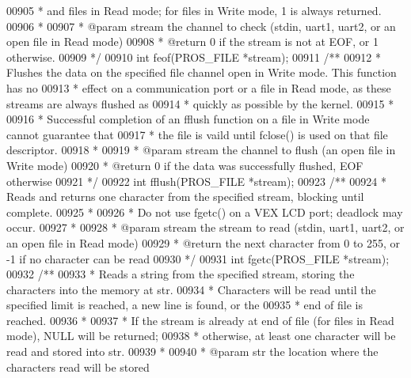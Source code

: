 \begin{DoxyCode}
00905 \textcolor{comment}{ * and files in Read mode; for files in Write mode, 1 is always returned.}
00906 \textcolor{comment}{ *}
00907 \textcolor{comment}{ * @param stream the channel to check (stdin, uart1, uart2, or an open file in Read mode)}
00908 \textcolor{comment}{ * @return 0 if the stream is not at EOF, or 1 otherwise.}
00909 \textcolor{comment}{ */}
00910 \textcolor{keywordtype}{int} feof(PROS_FILE *stream);
00911 \textcolor{comment}{/**}
00912 \textcolor{comment}{ * Flushes the data on the specified file channel open in Write mode. This function has no}
00913 \textcolor{comment}{ * effect on a communication port or a file in Read mode, as these streams are always flushed as}
00914 \textcolor{comment}{ * quickly as possible by the kernel.}
00915 \textcolor{comment}{ *}
00916 \textcolor{comment}{ * Successful completion of an fflush function on a file in Write mode cannot guarantee that}
00917 \textcolor{comment}{ * the file is vaild until fclose() is used on that file descriptor.}
00918 \textcolor{comment}{ *}
00919 \textcolor{comment}{ * @param stream the channel to flush (an open file in Write mode)}
00920 \textcolor{comment}{ * @return 0 if the data was successfully flushed, EOF otherwise}
00921 \textcolor{comment}{ */}
00922 \textcolor{keywordtype}{int} fflush(PROS_FILE *stream);
00923 \textcolor{comment}{/**}
00924 \textcolor{comment}{ * Reads and returns one character from the specified stream, blocking until complete.}
00925 \textcolor{comment}{ *}
00926 \textcolor{comment}{ * Do not use fgetc() on a VEX LCD port; deadlock may occur.}
00927 \textcolor{comment}{ *}
00928 \textcolor{comment}{ * @param stream the stream to read (stdin, uart1, uart2, or an open file in Read mode)}
00929 \textcolor{comment}{ * @return the next character from 0 to 255, or -1 if no character can be read}
00930 \textcolor{comment}{ */}
00931 \textcolor{keywordtype}{int} fgetc(PROS_FILE *stream);
00932 \textcolor{comment}{/**}
00933 \textcolor{comment}{ * Reads a string from the specified stream, storing the characters into the memory at str.}
00934 \textcolor{comment}{ * Characters will be read until the specified limit is reached, a new line is found, or the}
00935 \textcolor{comment}{ * end of file is reached.}
00936 \textcolor{comment}{ *}
00937 \textcolor{comment}{ * If the stream is already at end of file (for files in Read mode), NULL will be returned;}
00938 \textcolor{comment}{ * otherwise, at least one character will be read and stored into str.}
00939 \textcolor{comment}{ *}
00940 \textcolor{comment}{ * @param str the location where the characters read will be stored}

\end{DoxyCode}
